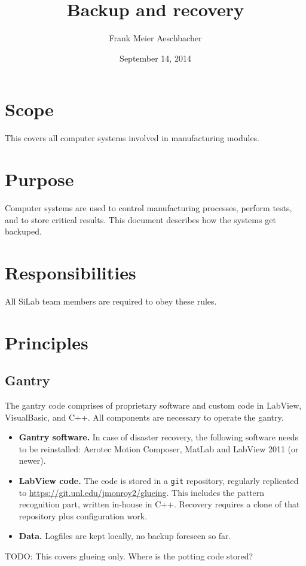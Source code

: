 \documentclass[12pt]{unlsilabsop}
\title{Backup and recovery}
\date{September 14, 2014}
\author{Frank Meier Aeschbacher}
\begin{document}
\maketitle

\section{Scope}
This covers all computer systems involved in manufacturing modules.

\section{Purpose}
Computer systems are used to control manufacturing processes, perform tests, and to store critical results. This document describes how the systems get backuped.


\section{Responsibilities}
All SiLab team members are required to obey these rules.

\section{Principles}

\subsection{Gantry}
The gantry code comprises of proprietary software and custom code in LabView, VisualBasic, and C++. All components are necessary to operate the gantry.
\begin{itemize}
    \item \textbf{Gantry software.} In case of disaster recovery, the following software needs to be reinstalled: Aerotec Motion Composer, MatLab and LabView 2011 (or newer).
    \item \textbf{LabView code.} The code is stored in a \texttt{git} repository, regularly replicated to \url{https://git.unl.edu/jmonroy2/glueing}. This includes the pattern recognition part, written in-house in C++. Recovery requires a clone of that repository plus configuration work.
    \item \textbf{Data.} Logfiles are kept locally, no backup foreseen so far.
\end{itemize}
TODO: This covers glueing only. Where is the potting code stored?
\end{document}
